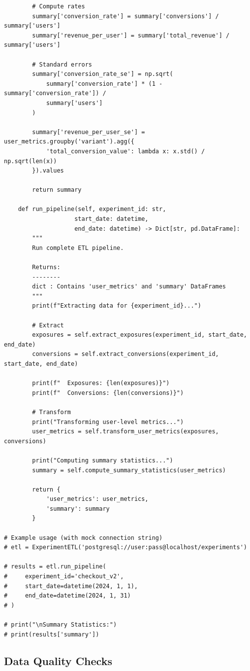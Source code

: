 \begin{lstlisting}
        # Compute rates
        summary['conversion_rate'] = summary['conversions'] / summary['users']
        summary['revenue_per_user'] = summary['total_revenue'] / summary['users']

        # Standard errors
        summary['conversion_rate_se'] = np.sqrt(
            summary['conversion_rate'] * (1 - summary['conversion_rate']) /
            summary['users']
        )

        summary['revenue_per_user_se'] = user_metrics.groupby('variant').agg({
            'total_conversion_value': lambda x: x.std() / np.sqrt(len(x))
        }).values

        return summary

    def run_pipeline(self, experiment_id: str,
                    start_date: datetime,
                    end_date: datetime) -> Dict[str, pd.DataFrame]:
        """
        Run complete ETL pipeline.

        Returns:
        --------
        dict : Contains 'user_metrics' and 'summary' DataFrames
        """
        print(f"Extracting data for {experiment_id}...")

        # Extract
        exposures = self.extract_exposures(experiment_id, start_date, end_date)
        conversions = self.extract_conversions(experiment_id, start_date, end_date)

        print(f"  Exposures: {len(exposures)}")
        print(f"  Conversions: {len(conversions)}")

        # Transform
        print("Transforming user-level metrics...")
        user_metrics = self.transform_user_metrics(exposures, conversions)

        print("Computing summary statistics...")
        summary = self.compute_summary_statistics(user_metrics)

        return {
            'user_metrics': user_metrics,
            'summary': summary
        }

# Example usage (with mock connection string)
# etl = ExperimentETL('postgresql://user:pass@localhost/experiments')

# results = etl.run_pipeline(
#     experiment_id='checkout_v2',
#     start_date=datetime(2024, 1, 1),
#     end_date=datetime(2024, 1, 31)
# )

# print("\nSummary Statistics:")
# print(results['summary'])
\end{lstlisting}

\subsection{Data Quality Checks}

